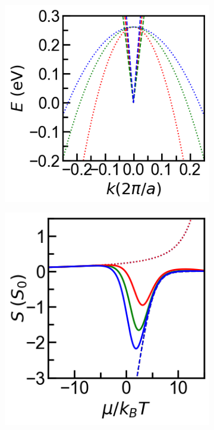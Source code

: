 \documentclass{article}
\begin{document}
\begin{figure}[ht]
  \centering
  \begin{subfigure}[b]{0.33\textwidth}
    \includegraphics[width=\textwidth]{../Fig2BM-typeI.png}
    \caption{}
  \end{subfigure}
  \begin{subfigure}[b]{0.33\textwidth}
    \includegraphics[width=\textwidth]{../Seebeck.png}

\end{subfigure}
\end{figure}
\end{document}
